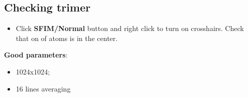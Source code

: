 \subsection{Checking trimer}
\begin{itemize}
\item Click \textbf{SFIM/Normal} button and right click to turn on crosshairs. Check that on of atoms is in the center.
\end{itemize}

\begin{framed}\noindent
  \textbf{Good parameters}:
  \begin{itemize}
  \item 1024x1024;
  \item 16 lines averaging
  \end{itemize}
\end{framed}

